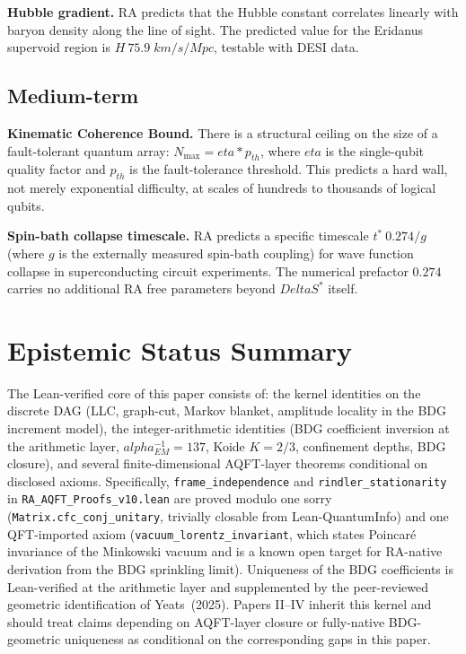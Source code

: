 \documentclass[11pt]{article}
\def\Delta{Delta}%
\def\alpha{alpha}%
\def\eta{eta}%
\def\mathrm#1{#1}%
\def\cdot{*}%
\def\approx{~}%
\begin{document}
\textbf{Hubble gradient.} RA predicts that the Hubble constant correlates linearly with baryon density along the line of sight. The predicted value for the Eridanus supervoid region is $H\approx 75.9\;\mathrm{km/s/Mpc}$, testable with DESI data.

\subsection{Medium-term}

\textbf{Kinematic Coherence Bound.} There is a structural ceiling on the size of a fault-tolerant quantum array: $N_{\max}=\eta\cdot p_{\mathrm{th}}$, where $\eta$ is the single-qubit quality factor and $p_{\mathrm{th}}$ is the fault-tolerance threshold. This predicts a hard wall, not merely exponential difficulty, at scales of hundreds to thousands of logical qubits.

\textbf{Spin-bath collapse timescale.} RA predicts a specific timescale $t^*\approx 0.274/g$ (where $g$ is the externally measured spin-bath coupling) for wave function collapse in superconducting circuit experiments. The numerical prefactor $0.274$ carries no additional RA free parameters beyond $\Delta S^*$ itself.

\section{Epistemic Status Summary}
\label{sec:status}

\begin{tcolorbox}[title=Scope of the Lean-verified layer,colback=gray!5,colframe=gray!60]
The Lean-verified core of this paper consists of: the kernel identities on the discrete DAG (LLC, graph-cut, Markov blanket, amplitude locality in the BDG increment model), the integer-arithmetic identities (BDG coefficient inversion at the arithmetic layer, $\alpha_{\mathrm{EM}}^{-1}=137$, Koide $K=2/3$, confinement depths, BDG closure), and several finite-dimensional AQFT-layer theorems conditional on disclosed axioms. Specifically, \texttt{frame\_independence} and \texttt{rindler\_stationarity} in \texttt{RA\_AQFT\_Proofs\_v10.lean} are proved modulo one sorry (\texttt{Matrix.cfc\_conj\_unitary}, trivially closable from Lean-QuantumInfo) and one QFT-imported axiom (\texttt{vacuum\_lorentz\_invariant}, which states Poincar\'e invariance of the Minkowski vacuum and is a known open target for RA-native derivation from the BDG sprinkling limit). Uniqueness of the BDG coefficients is Lean-verified at the arithmetic layer and supplemented by the peer-reviewed geometric identification of Yeats~(2025). Papers II--IV inherit this kernel and should treat claims depending on AQFT-layer closure or fully-native BDG-geometric uniqueness as conditional on the corresponding gaps in this paper.
\end{tcolorbox}
\end{document}
